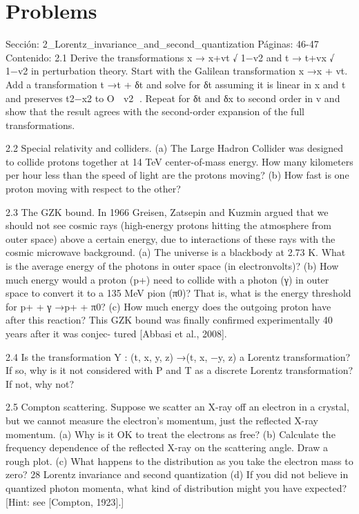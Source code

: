 \section*{Problems}
Sección: 2_Lorentz_invariance_and_second_quantization
Páginas: 46-47
Contenido:
2.1 Derive the transformations x →
x+vt
√
1−v2 and t →
t+vx
√
1−v2 in perturbation theory. Start
with the Galilean transformation x →x + vt. Add a transformation t →t + δt and
solve for δt assuming it is linear in x and t and preserves t2−x2 to O

v2
. Repeat for
δt and δx to second order in v and show that the result agrees with the second-order
expansion of the full transformations.

2.2 Special relativity and colliders.
(a) The Large Hadron Collider was designed to collide protons together at 14 TeV
center-of-mass energy. How many kilometers per hour less than the speed of light
are the protons moving?
(b) How fast is one proton moving with respect to the other?

2.3 The GZK bound. In 1966 Greisen, Zatsepin and Kuzmin argued that we should
not see cosmic rays (high-energy protons hitting the atmosphere from outer space)
above a certain energy, due to interactions of these rays with the cosmic microwave
background.
(a) The universe is a blackbody at 2.73 K. What is the average energy of the photons
in outer space (in electronvolts)?
(b) How much energy would a proton (p+) need to collide with a photon (γ) in outer
space to convert it to a 135 MeV pion (π0)? That is, what is the energy threshold
for p+ + γ →p+ + π0?
(c) How much energy does the outgoing proton have after this reaction?
This GZK bound was ﬁnally conﬁrmed experimentally 40 years after it was conjec-
tured [Abbasi et al., 2008].

2.4 Is the transformation Y : (t, x, y, z) →(t, x, −y, z) a Lorentz transformation? If so,
why is it not considered with P and T as a discrete Lorentz transformation? If not,
why not?

2.5 Compton scattering. Suppose we scatter an X-ray off an electron in a crystal, but we
cannot measure the electron’s momentum, just the reﬂected X-ray momentum.
(a) Why is it OK to treat the electrons as free?
(b) Calculate the frequency dependence of the reﬂected X-ray on the scattering angle.
Draw a rough plot.
(c) What happens to the distribution as you take the electron mass to zero?
28
Lorentz invariance and second quantization
(d) If you did not believe in quantized photon momenta, what kind of distribution
might you have expected? [Hint: see [Compton, 1923].]


